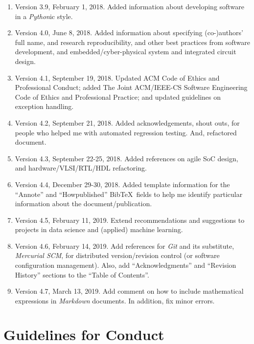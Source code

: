 \documentclass[letter,12pt]{article}
\begin{document}
\begin{enumerate}
\item Version 3.9, February 1, 2018. Added information about developing software in a {\it Python}ic style.
\item Version 4.0, June 8, 2018. Added information about specifying (co-)authors' full name, and research reproducibility, and other best practices from software development, and embedded/cyber-physical system and integrated circuit design.
\item Version 4.1, September 19, 2018. Updated ACM Code of Ethics and Professional Conduct; added The Joint {ACM/IEEE-CS} Software Engineering Code of Ethics and Professional Practice; and updated guidelines on exception handling.
\item Version 4.2, September 21, 2018. Added acknowledgements, shout outs, for people who helped me with automated regression testing. And, refactored document.
\item Version 4.3, September 22-25, 2018. Added references on agile SoC design, and hardware/VLSI/RTL/HDL refactoring.
\item Version 4.4, December 29-30, 2018. Added template information for the ``Annote'' and ``Howpublished'' {\sc Bib}\TeX\ fields to help me identify particular information about the document/publication.
\item Version 4.5, February 11, 2019. Extend recommendations and suggestions to projects in data science and (applied) machine learning.
\item Version 4.6, February 14, 2019. Add references for {\it Git} and its substitute, {\it Mercurial SCM}, for distributed version/revision control (or software configuration management). Also, add ``Acknowledgments'' and ``Revision History'' sections to the ``Table of Contents''.
\item Version 4.7, March 13, 2019. Add comment on how to include mathematical expressions in {\it Markdown} documents. In addition, fix minor errors.
\end{enumerate}









\section{Guidelines for Conduct}
\label{sec:GuidelinesforConduct}
\end{document}
